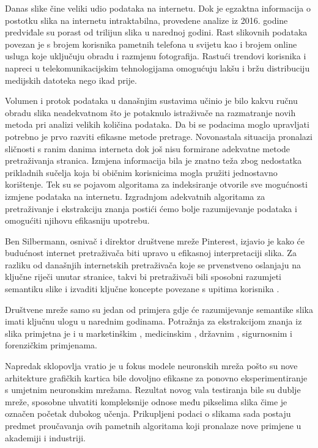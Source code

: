 \documentclass[times, utf8, proizvoljni, numeric]{fer}
\begin{document}
Danas slike čine veliki udio podataka na internetu. Dok je egzaktna informacija o postotku slika na internetu intraktabilna, provedene analize iz 2016. godine \cite{img-analysis} predviđale su porast od trilijun slika u narednoj godini. Rast slikovnih podataka povezan je s brojem korisnika pametnih telefona u svijetu kao i brojem online usluga koje uključuju obradu i razmjenu fotografija. Rastući trendovi korisnika \cite{net-users} i napreci u telekomunikacijskim tehnologijama omogućuju lakšu i bržu distribuciju medijskih datoteka nego ikad prije. 

Volumen i protok podataka u današnjim sustavima učinio je bilo kakvu ručnu obradu slika neadekvatnom što je potaknulo istraživače na razmatranje novih metoda pri analizi velikih količina podataka. Da bi se podacima moglo upravljati potrebno je prvo razviti efikasne metode pretrage. Novonastala situacija pronalazi sličnosti s ranim danima interneta dok još nisu formirane adekvatne metode pretraživanja stranica. Izmjena informacija bila je znatno teža zbog nedostatka prikladnih sučelja koja bi običnim korisnicima mogla pružiti jednostavno korištenje. Tek su se pojavom algoritama za indeksiranje otvorile sve mogućnosti izmjene podataka na internetu. Izgradnjom adekvatnih algoritama za pretraživanje i ekstrakciju znanja postići ćemo bolje razumijevanje podataka i omogućiti njihovu efikasniju upotrebu. 

Ben Silbermann, osnivač i direktor društvene mreže Pinterest, izjavio je kako će budućnost internet pretraživača biti upravo u efikasnoj interpretaciji slika. Za razliku od današnjih internetskih pretraživača koje se prvenstveno oslanjaju na ključne riječi unutar stranice, takvi bi pretraživači bili sposobni razumjeti semantiku slike i izvaditi ključne koncepte povezane s upitima korisnika \cite{internet-trends}.

Društvene mreže samo su jedan od primjera gdje će razumijevanje semantike slika imati ključnu ulogu u narednim godinama. Potražnja za ekstrakcijom znanja iz slika primjetna je i u marketinškim \cite{electronic-commerce-application}, medicinskim \cite{medical-application} \cite{medical-diagnostics-application}, državnim \cite{smart-city-application}, sigurnosnim \cite{security-application} i forenzičkim \cite{forensics-application} primjenama. 

Napredak sklopovlja vratio je u fokus modele neuronskih mreža pošto su nove arhitekture grafičkih kartica bile dovoljno efikasne za ponovno eksperimentiranje s umjetnim neuronskim mrežama. Rezultat novog vala testiranja bile su dublje mreže, sposobne uhvatiti kompleksnije odnose među pikselima slika čime je označen početak dubokog učenja. Prikupljeni podaci o slikama sada postaju predmet proučavanja ovih pametnih algoritama koji pronalaze nove primjene u akademiji i industriji. 
\end{document}
